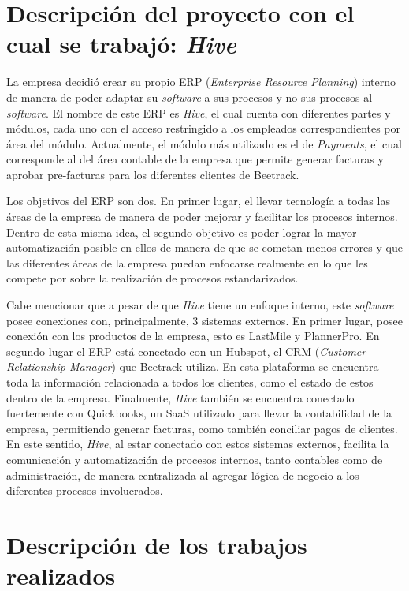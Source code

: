     
\section{Descripción del proyecto con el cual se trabajó: \textit{Hive}}
    
    La empresa decidió crear su propio ERP (\textit{Enterprise Resource Planning}) interno de manera de poder adaptar su \textit{software} a sus procesos y no sus procesos al \textit{software}. El nombre de este ERP es \textit{Hive}, el cual cuenta con diferentes partes y módulos, cada uno con el acceso restringido a los empleados correspondientes por área del módulo. Actualmente, el módulo más utilizado es el de \textit{Payments}, el cual corresponde al del área contable de la empresa que permite generar facturas y aprobar pre-facturas para los diferentes clientes de Beetrack.

    Los objetivos del ERP son dos. En primer lugar, el llevar tecnología a todas las áreas de la empresa de manera de poder mejorar y facilitar los procesos internos. Dentro de esta misma idea, el segundo objetivo es poder lograr la mayor automatización posible en ellos de manera de que se cometan menos errores y que las diferentes áreas de la empresa puedan enfocarse realmente en lo que les compete por sobre la realización de procesos estandarizados.
    
    Cabe mencionar que a pesar de que \textit{Hive} tiene un enfoque interno, este \textit{software} posee conexiones con, principalmente, 3 sistemas externos. En primer lugar, posee conexión con los productos de la empresa, esto es LastMile y PlannerPro. En segundo lugar el ERP está conectado con un Hubspot, el CRM (\textit{Customer Relationship Manager}) que Beetrack utiliza. En esta plataforma se encuentra toda la información relacionada a todos los clientes, como el estado de estos dentro de la empresa. Finalmente, \textit{Hive} también se encuentra conectado fuertemente con Quickbooks, un SaaS utilizado para llevar la contabilidad de la empresa, permitiendo generar facturas, como también conciliar pagos de clientes. En este sentido, \textit{Hive}, al estar conectado con estos sistemas externos, facilita la comunicación y automatización de procesos internos, tanto contables como de administración, de manera centralizada al agregar lógica de negocio a los diferentes procesos involucrados.


\section{Descripción de los trabajos realizados}

